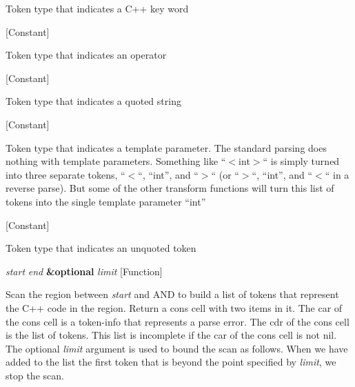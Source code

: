 \begin{doc-string}
Token type that indicates a C++ key word
\end{doc-string}

\vspace{1em}
\noindent
{}
\usebox{\funcname}
 \hfill [Constant]

\begin{doc-string}
Token type that indicates an operator
\end{doc-string}

\vspace{1em}
\noindent
{}
\usebox{\funcname}
 \hfill [Constant]

\begin{doc-string}
Token type that indicates a quoted string
\end{doc-string}

\vspace{1em}
\noindent
{}
\usebox{\funcname}
 \hfill [Constant]

\begin{doc-string}
Token type that indicates a template parameter.  The standard parsing does nothing
with template parameters.  Something like ``$<$int$>$`` is simply turned into three separate
tokens, ``$<$``, ``int'', and ``$>$`` (or ``$>$``, ``int'', and ``$<$`` in a reverse parse).
But some of the other transform functions will turn this list of tokens into the single
template parameter ``int''
\end{doc-string}

\vspace{1em}
\noindent
{}
\usebox{\funcname}
 \hfill [Constant]

\begin{doc-string}
Token type that indicates an unquoted token
\end{doc-string}

\vspace{1em}
\noindent
{}
\usebox{\funcname}\emph{start} \emph{end} \textbf{\&optional} \emph{limit}
 \hfill [Function]

\begin{doc-string}
Scan the region between \emph{start} and AND to build a list of tokens that represent the C++
code in the region.  Return a cons cell with two items in it.  The car of the cons cell
is a token-info that represents a parse error.  The cdr of the cons cell is the list of
tokens.  This list is incomplete if the car of the cons cell is not nil.  The optional
\emph{limit} argument is used to bound the scan as follows.  When we have added to the list the
first token that is beyond the point specified by \emph{limit}, we stop the scan.
\end{doc-string}

